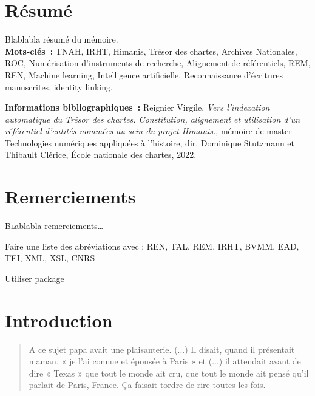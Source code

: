 \documentclass[a4paper,12pt,twoside]{book}
\begin{document}
	\chapter{Résumé}
	\medskip
	Blablabla résumé du mémoire.\\
	
	\textbf{Mots-clés~:} TNAH, IRHT, Himanis, Trésor des chartes, Archives Nationales, ROC, Numérisation d'instruments de recherche, Alignement de référentiels, REM, REN, Machine learning, Intelligence artificielle, Reconnaissance d'écritures manuscrites, identity linking.
	
	\textbf{Informations bibliographiques~:} Reignier Virgile, \textit{Vers l’indexation automatique du Trésor des chartes. Constitution, alignement et utilisation d'un référentiel d’entités nommées au sein du projet Himanis.}, mémoire de master \og{}Technologies numériques appliquées à l'histoire\fg{}, dir. Dominique Stutzmann et Thibault Clérice, École nationale des chartes, 2022.
	
	\chapter{Remerciements}
	
	\lettrine{B}lablabla remerciements\dots
	
		Faire une liste des abréviations avec : REN, TAL, REM, IRHT, BVMM, EAD, TEI, XML, XSL, CNRS
		
		Utiliser package %
	
	\printbibliography
	
	\chapter{Introduction}
	
	\begin{quotation}
		
	A ce sujet papa avait une plaisanterie. (...) Il disait, quand il présentait maman, « je l’ai connue et épousée à Paris » et (...) il attendait avant de dire « Texas » que tout le monde ait cru, que tout le monde ait pensé qu’il parlait de Paris, France. Ça faisait tordre de rire toutes les fois.
	
	\end{quotation}
	\bigbreak
	
\end{document}
